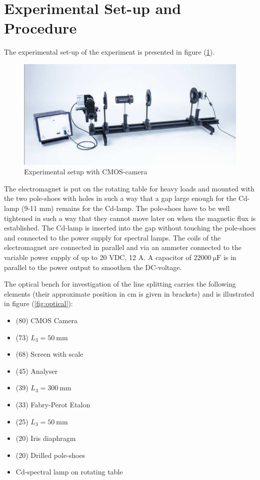 \documentclass[%
 reprint,
nofootinbib,
 amsmath,amssymb,
 aps,
floatfix,
]{revtex4-2}
\begin{document}
\section{Experimental Set-up and Procedure}
    The experimental set-up of the experiment is presented in figure (\ref{fig:cmos}).
    \begin{figure}
        \centering
        \includegraphics[scale = 0.6]{Figures/cmossetup.png}
        \caption{Experimental setup	with CMOS-camera}
        \label{fig:cmos}
    \end{figure}
    The electromagnet is put on the rotating table for heavy loads and mounted with the two pole-shoes with holes in such a way that a gap large enough for the Cd-lamp (9-11 mm) remains for the Cd-lamp. The pole-shoes have to be well tightened in such a way that they cannot move later on when the magnetic flux is established. The Cd-lamp is inserted into the gap without touching the pole-shoes and connected to the power supply for spectral lamps. The coils of the electromagnet are connected in parallel and via an ammeter connected to the variable power supply of up to 20 VDC, 12 A. A capacitor of $\SI{22000}{\micro \farad}$ is in parallel to the power output to smoothen the DC-voltage.
    \par
    The optical bench for investigation of the line splitting carries the following elements (their approximate position in cm is given in brackets) and is illustrated in figure (\ref{fig:optical}):
    \begin{itemize}
        \item (80) CMOS Camera
        \item (73) $L_3 = \SI{50}{\milli \metre}$
        \item (68) Screen with scale
        \item (45) Analyser
        \item (39) $L_3 = \SI{300}{\milli \metre}$
        \item (33) Fabry-Perot Etalon
        \item (25) $L_3 = \SI{50}{\milli \metre}$
        \item (20) Iris diaphragm
        \item (20) Drilled pole-shoes
        \item Cd-spectral lamp on rotating table
    \end{itemize}
\end{document}
